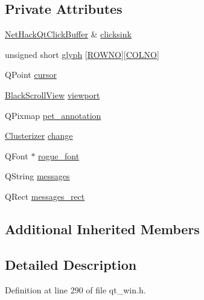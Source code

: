 \subsection*{Private Attributes}
\begin{DoxyCompactItemize}
\item 
\hyperlink{classNetHackQtClickBuffer}{Net\+Hack\+Qt\+Click\+Buffer} \& \hyperlink{classNetHackQtMapWindow_a3dda8e7be0ceaa255ca84ceb1319f789}{clicksink}
\item 
unsigned short \hyperlink{classNetHackQtMapWindow_ae1ffb32e364b3b4a4f7e942177740fbe}{glyph} \mbox{[}\hyperlink{gnmap_8c_a9cce134868d97b23c35bcf1ff4a343d8}{R\+O\+W\+N\+O}\mbox{]}\mbox{[}\hyperlink{gnmap_8c_a308dbfcc29f5a427c0315f3cbf03c3ed}{C\+O\+L\+N\+O}\mbox{]}
\item 
Q\+Point \hyperlink{classNetHackQtMapWindow_a6451ba4e2f665364617753d1bc57d5d5}{cursor}
\item 
\hyperlink{classBlackScrollView}{Black\+Scroll\+View} \hyperlink{classNetHackQtMapWindow_a79a34e42d09f5a02a8a70a985e8d075c}{viewport}
\item 
Q\+Pixmap \hyperlink{classNetHackQtMapWindow_a426400108746c47f1aa6e1d262d01a67}{pet\+\_\+annotation}
\item 
\hyperlink{classClusterizer}{Clusterizer} \hyperlink{classNetHackQtMapWindow_a79c1078b064277e0a876e638f326f9cd}{change}
\item 
Q\+Font $\ast$ \hyperlink{classNetHackQtMapWindow_aea4af4ef1c774e5d90126f793aa92eca}{rogue\+\_\+font}
\item 
Q\+String \hyperlink{classNetHackQtMapWindow_a750f7a7e26f94f0050b1a1fa562fbebd}{messages}
\item 
Q\+Rect \hyperlink{classNetHackQtMapWindow_aa8417d2ba975a48ae239a280223adbfd}{messages\+\_\+rect}
\end{DoxyCompactItemize}
\subsection*{Additional Inherited Members}


\subsection{Detailed Description}


Definition at line 290 of file qt\+\_\+win.\+h.



